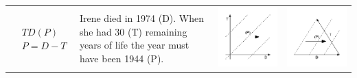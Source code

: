 \documentclass[11pt,oneside,a4paper]{article} %
\begin{document}
\begin{center}
\begin{longtable}{m{}m{}m{}m{}}
  \midrule
  $$\begin{aligned}
    &TD(P) \\
    &P = D - T
  \end{aligned}$$ &
  Irene died in 1974 (D). When she had 30 (T) remaining years of life the year
  must have been 1944 (P).& \includegraphics[width =
  \linewidth]{Figures/JonasTable/TDp.pdf} & \includegraphics[width = \linewidth]{Figures/JonasTable/TDp_iso.pdf}  \\

\end{longtable}
\end{center}
\end{document}
